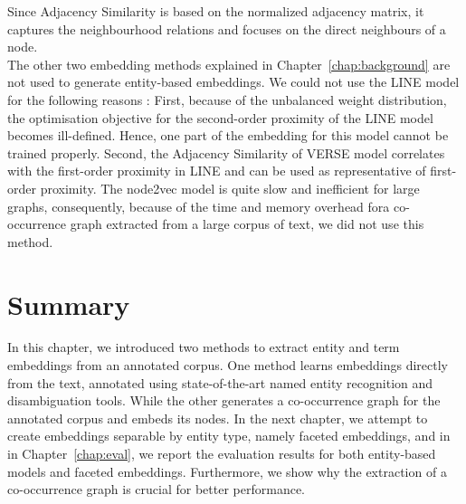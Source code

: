 Since Adjacency Similarity is based on the normalized adjacency matrix, it captures the neighbourhood relations and focuses on the direct neighbours of a node.\\
The other two embedding methods explained in Chapter~\ref{chap:background} are not used to generate entity-based embeddings. We could not use the LINE model for the following reasons : First, because of the unbalanced weight distribution, the optimisation objective for the second-order proximity of the LINE model becomes ill-defined. Hence, one part of the embedding for this model cannot be trained properly. Second, the Adjacency Similarity of VERSE model correlates with the first-order proximity in LINE and can be used as representative of first-order proximity. The node2vec model is quite slow and inefficient for large graphs, consequently, because of the time and memory overhead fora co-occurrence graph extracted from a large corpus of text, we did not use this method.  \\
\section{Summary}\label{sec:entity_summary}
In this chapter, we introduced two methods to extract entity and term embeddings from an annotated corpus. One method learns embeddings directly from the text, annotated using state-of-the-art named entity recognition and disambiguation tools. While the other generates a co-occurrence graph for the annotated corpus and embeds its nodes. In the next chapter, we attempt to create embeddings separable by entity type, namely faceted embeddings, and in in Chapter~\ref{chap:eval}, we report the evaluation results for both entity-based models and faceted embeddings. Furthermore, we show why the extraction of a co-occurrence graph is crucial for better performance. 
